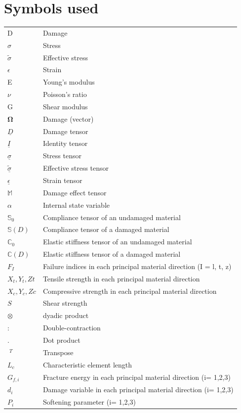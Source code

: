 \documentclass[12pt,a4paper,twoside,openright]{report}
\begin{document}
\section*{Symbols used}
\begin{longtable}{l l}
D &  Damage \\
$\sigma$ & Stress \\
$\tilde{\sigma}$ & Effective stress \\
$\epsilon$ & Strain \\
E  &  Young's modulus \\
$\nu$  &  Poisson's ratio \\
G &  Shear modulus \\
$\mathbf{\Omega}$  &  Damage (vector) \\
$\underline{D}$ &  Damage tensor \\
$\underline{I}$ &  Identity tensor  \\
$\underline{\sigma}$  &  Stress tensor \\
$\underline{\tilde{\sigma}}$  &  Effective stress tensor \\
$\underline{\epsilon}$  &  Strain tensor \\
$\mathbb{M}$  & Damage effect tensor  \\
$\alpha$  &  Internal state variable \\
$\mathbb{S}_{0}$  &  Compliance tensor of an undamaged material \\ 
$\mathbb{S}(D)$  &  Compliance tensor of a damaged material \\ 
$\mathbb{C}_{0}$  &  Elastic stiffness tensor of an undamaged material \\
$\mathbb{C}(D)$  &  Elastic stiffness tensor of a damaged material \\
$F_{I}$ & Failure indices in each principal material direction (I = l, t, z)\\
$X_{t}, Y_{t}, Z{t}$ & Tensile strength in each principal material direction \\ 
$X_{c}, Y_{c}, Z{c}$ & Compressive strength in each principal material direction \\ 
$S$ & Shear strength \\
$\otimes$ & dyadic product \\
$:$ & Double-contraction \\
$.$ & Dot product \\
$\; ^{T}$ & Transpose \\ 
$L_{c}$ & Characteristic element length \\
$G_{f, i}$ & Fracture energy in each principal material direction (i= 1,2,3)\\
$d_{i}$  &  Damage variable in each principal material direction (i= 1,2,3)\\
$P_{i}$  & Softening parameter (i= 1,2,3)\\
\end{longtable}
\end{document}
